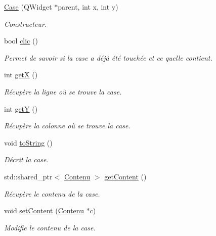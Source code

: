 \begin{DoxyCompactItemize}
\item 
\hyperlink{class_case_a5fc4408a8eea8e390fd9b8d3ae6345a7}{Case} (Q\+Widget $\ast$parent, int x, int y)
\begin{DoxyCompactList}\small\item\em Constructeur. \end{DoxyCompactList}\item 
bool \hyperlink{class_case_afa446bb3223628f76144f077df5e7618}{clic} ()
\begin{DoxyCompactList}\small\item\em Permet de savoir si la case a déjà été touchée et ce qu\textquotesingle{}elle contient. \end{DoxyCompactList}\item 
int \hyperlink{class_case_ab5580b919199dd2ec379672d3390bbff}{getX} ()
\begin{DoxyCompactList}\small\item\em Récupère la ligne où se trouve la case. \end{DoxyCompactList}\item 
int \hyperlink{class_case_a824f612c5a660a1d55ac06931747c46d}{getY} ()
\begin{DoxyCompactList}\small\item\em Récupère la colonne où se trouve la case. \end{DoxyCompactList}\item 
void \hyperlink{class_case_a77e28934961e13da9fcf0f1168b8e7a4}{to\+String} ()
\begin{DoxyCompactList}\small\item\em Décrit la case. \end{DoxyCompactList}\item 
std\+::shared\+\_\+ptr$<$ \hyperlink{class_contenu}{Contenu} $>$ \hyperlink{class_case_ae761fa055a6c3e3e228d22b503b525ae}{get\+Content} ()
\begin{DoxyCompactList}\small\item\em Récupère le contenu de la case. \end{DoxyCompactList}\item 
void \hyperlink{class_case_a474429530bc089e09a51410ca92a5ad7}{set\+Content} (\hyperlink{class_contenu}{Contenu} $\ast$c)
\begin{DoxyCompactList}\small\item\em Modifie le contenu de la case. \end{DoxyCompactList}\item 

\end{DoxyCompactItemize}
